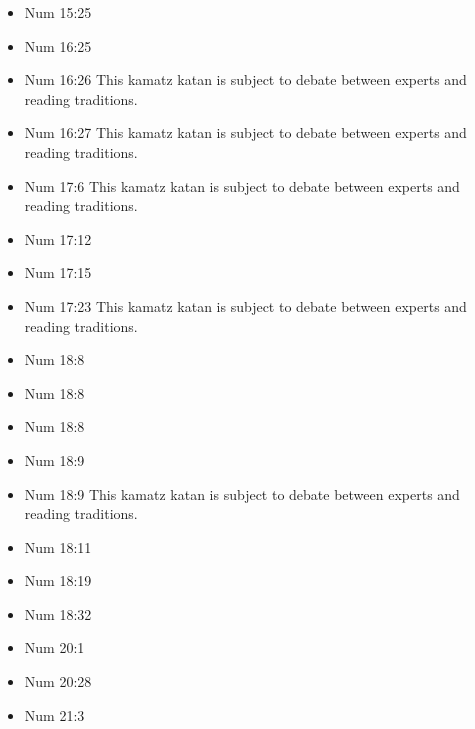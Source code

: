 \documentclass[14pt]{article}
\begin{document}
\begin{multicols}{2}
\begin{itemize}
\item Num 15:25

\item Num 16:25

\item Num 16:26 This kamatz katan is subject to debate between experts and reading traditions.

\item Num 16:27 This kamatz katan is subject to debate between experts and reading traditions.

\item Num 17:6 This kamatz katan is subject to debate between experts and reading traditions.

\item Num 17:12

\item Num 17:15

\item Num 17:23 This kamatz katan is subject to debate between experts and reading traditions.

\item Num 18:8

\item Num 18:8

\item Num 18:8

\item Num 18:9

\item Num 18:9 This kamatz katan is subject to debate between experts and reading traditions.

\item Num 18:11

\item Num 18:19

\item Num 18:32

\item Num 20:1

\item Num 20:28

\item Num 21:3


\end{itemize}
\end{multicols}
\end{document}
